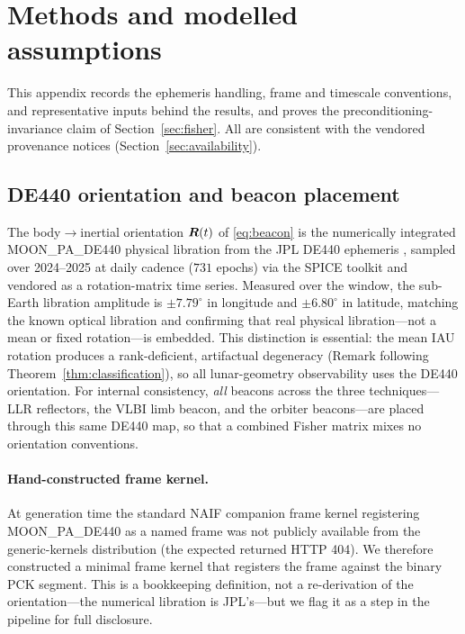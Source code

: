\section{Methods and modelled assumptions}
\label{app:methods}

This appendix records the ephemeris handling, frame and timescale conventions, and
representative inputs behind the results, and proves the preconditioning-invariance
claim of Section~\ref{sec:fisher}. All are consistent with the vendored provenance
notices (Section~\ref{sec:availability}).

\subsection{DE440 orientation and beacon placement}
\label{app:de440}

The body$\rightarrow$inertial orientation $\bm{R}(t)$ of \eqref{eq:beacon} is the
numerically integrated MOON\_PA\_DE440 physical libration from the JPL DE440
ephemeris \citep{park2021de440}, sampled over 2024--2025 at daily cadence
($731$ epochs) via the SPICE toolkit and vendored as a rotation-matrix time series.
Measured over the window, the sub-Earth libration amplitude is
$\pm7.79^\circ$ in longitude and $\pm6.80^\circ$ in latitude, matching the known
optical libration and confirming that real physical libration---not a mean or fixed
rotation---is embedded. This distinction is essential: the mean IAU rotation
produces a rank-deficient, artifactual degeneracy
(Remark following Theorem~\ref{thm:classification}), so all lunar-geometry
observability uses the DE440 orientation. For internal consistency, \emph{all}
beacons across the three techniques---LLR reflectors, the VLBI limb beacon, and the
orbiter beacons---are placed through this same DE440 map, so that a combined Fisher
matrix mixes no orientation conventions.

\paragraph{Hand-constructed frame kernel.} At generation time the standard NAIF
companion frame kernel registering MOON\_PA\_DE440 as a named frame was not
publicly available from the generic-kernels distribution (the expected
 returned HTTP 404). We therefore constructed a minimal frame kernel that
registers the frame against the binary PCK segment. This is a bookkeeping
definition, not a re-derivation of the orientation---the numerical libration is JPL's---but
we flag it as a \Modelled{} step in the pipeline for full disclosure.

